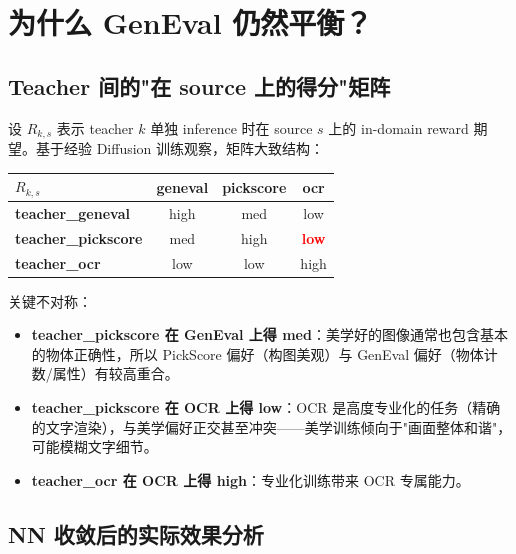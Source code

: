 \documentclass[11pt,a4paper]{article}
\begin{document}
\section{为什么 GenEval 仍然平衡？}

\subsection{Teacher 间的"在 source 上的得分"矩阵}

设 $R_{k,s}$ 表示 teacher $k$ 单独 inference 时在 source $s$ 上的 in-domain reward 期望。基于经验 Diffusion 训练观察，矩阵大致结构：

\begin{center}
\begin{tabular}{l|ccc}
\toprule
$R_{k,s}$ & \textbf{geneval} & \textbf{pickscore} & \textbf{ocr} \\
\midrule
\textbf{teacher\_geneval}   & high & med  & low \\
\textbf{teacher\_pickscore} & med  & high & \textcolor{red}{\textbf{low}} \\
\textbf{teacher\_ocr}       & low  & low  & high \\
\bottomrule
\end{tabular}
\end{center}

关键不对称：
\begin{tcolorbox}[colback=yellow!5, colframe=orange!50, title=Teacher 性能不对称]
\begin{itemize}
    \item \textbf{teacher\_pickscore 在 GenEval 上得 med}：美学好的图像通常也包含基本的物体正确性，所以 PickScore 偏好（构图美观）与 GenEval 偏好（物体计数/属性）有较高重合。
    \item \textbf{teacher\_pickscore 在 OCR 上得 low}：OCR 是高度专业化的任务（精确的文字渲染），与美学偏好正交甚至冲突——美学训练倾向于"画面整体和谐"，可能模糊文字细节。
    \item \textbf{teacher\_ocr 在 OCR 上得 high}：专业化训练带来 OCR 专属能力。
\end{itemize}
\end{tcolorbox}

\subsection{NN 收敛后的实际效果分析}
\end{document}
